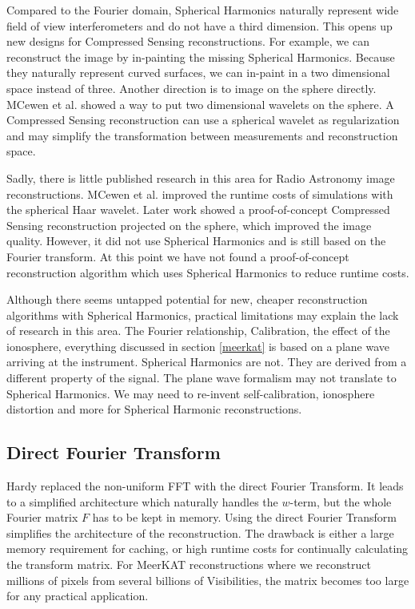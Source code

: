Compared to the Fourier domain, Spherical Harmonics naturally represent wide field of view interferometers and do not have a third dimension. This opens up new designs for Compressed Sensing reconstructions. For example, we can reconstruct the image by in-painting the missing Spherical Harmonics. Because they naturally represent curved surfaces, we can in-paint in a two dimensional space instead of three. Another direction is to image on the sphere directly. MCewen et al.\cite{mcewen2008simulating} showed a way to put two dimensional wavelets on the sphere. A Compressed Sensing reconstruction can use a spherical wavelet as regularization and may simplify the transformation between measurements and reconstruction space.

Sadly, there is little published research in this area for Radio Astronomy image reconstructions. MCewen et al.\cite{mcewen2008simulating} improved the runtime costs of simulations with the spherical Haar wavelet. Later work\cite{mcewen2011compressed} showed a proof-of-concept Compressed Sensing reconstruction projected on the sphere, which improved the image quality. However, it did not use Spherical Harmonics and \cite{mcewen2011compressed} is still based on the Fourier transform. At this point we have not found a proof-of-concept reconstruction algorithm which uses Spherical Harmonics to reduce runtime costs. 

Although there seems untapped potential for new, cheaper reconstruction algorithms with Spherical Harmonics, practical limitations may explain the lack of research in this area. The Fourier relationship, Calibration, the effect of the ionosphere, everything discussed in section \ref{meerkat} is based on a plane wave arriving at the instrument\cite{thompson1986interferometry, smirnov2011revisiting}. Spherical Harmonics are not. They are derived from a different property of the signal. The plane wave formalism may not translate to Spherical Harmonics. We may need to re-invent self-calibration, ionosphere distortion and more for Spherical Harmonic reconstructions.


\subsection{Direct Fourier Transform}
Hardy\cite{hardy2013direct} replaced the non-uniform FFT with the direct Fourier Transform. It leads to a simplified architecture which naturally handles the $w$-term, but the whole Fourier matrix $F$ has to be kept in memory. Using the direct Fourier Transform simplifies the architecture of the reconstruction. The drawback is either a large memory requirement for caching, or high runtime costs for continually calculating the transform matrix. For MeerKAT reconstructions where we reconstruct millions of pixels from several billions of Visibilities, the matrix becomes too large for any practical application.


